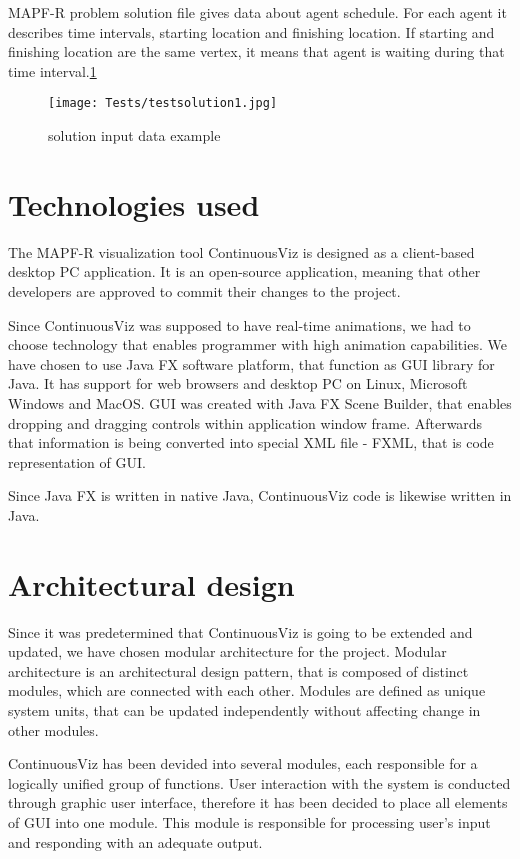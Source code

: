 \documentclass[thesis=B,english]{FITthesis}[2019/12/23]
\begin{document}
MAPF-R problem solution file gives data about agent schedule. For each agent it describes time intervals, starting location and finishing location. If starting and finishing location are the same vertex, it means that agent is waiting during that time interval.\ref{fig:float106}

\begin{figure}[H]
	\texttt{[image: Tests/testsolution1.jpg]}
	\caption[solution input data example]{solution input data example}\label{fig:float106}
\end{figure}



\section{Technologies used}

The MAPF-R visualization tool ContinuousViz is designed as a client-based desktop PC application. It is an open-source application, meaning that other developers are approved to commit their changes to the project.

Since ContinuousViz was supposed to have real-time animations, we had to choose technology that enables programmer with high animation capabilities. We have chosen to use Java FX software platform, that function as GUI library for Java. It has support for web browsers and desktop PC on Linux, Microsoft Windows and MacOS.
GUI was created with Java FX Scene Builder, that enables dropping and dragging controls within application window frame. Afterwards that information is being converted into special XML file - FXML, that is code representation of GUI. 

Since Java FX is written in native Java, ContinuousViz code is likewise written in Java.

\section{Architectural design}

Since it was predetermined that ContinuousViz is going to be extended and updated, we have chosen modular architecture for the project. Modular architecture is an architectural design pattern, that is composed of distinct modules, which are connected with each other. Modules are defined as unique system units, that can be updated independently without affecting change in other modules. 

ContinuousViz has been devided into several modules, each responsible for a logically unified group of functions. User interaction with the system is conducted through graphic user interface, therefore it has been decided to place all elements of GUI into one module. This module is responsible for processing user's input and responding with an adequate output.
\end{document}
